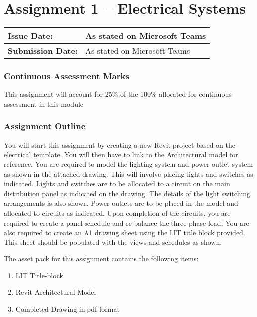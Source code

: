 


	
\part*{Assignment 1 – Electrical Systems}

\begin{tabularx}{\textwidth}{ |X|X| }
	\hline
	\textbf{Issue Date:} & As stated on Microsoft Teams \\
	\hline 
	\textbf{Submission Date:}  & As stated on Microsoft Teams  \\
	\hline
\end{tabularx}


\section*{Continuous Assessment Marks}
This assignment will account for 25\% of the 100\% allocated for continuous assessment in this module

\section*{Assignment Outline}
You will start this assignment by creating a new Revit project based on the electrical template. You will then have to link to the Architectural model for reference.
You are required to model the lighting system and power outlet system as shown in the attached drawing. This will involve placing lights and switches as indicated. Lights and switches are to be allocated to a circuit on the main distribution panel as indicated on the drawing. The details of the light switching arrangements is also shown.
Power outlets are to be placed in the model and allocated to circuits as indicated.
Upon completion of the circuits, you are required to create a panel schedule and re-balance the three-phase load.
You are also required to create an A1 drawing sheet using the LIT title block provided. This sheet should be populated with the views and schedules as shown.

The asset pack for this assignment contains the following items:
\begin{enumerate}
	\item LIT Title-block
	\item Revit Architectural Model
	\item Completed Drawing in pdf format
\end{enumerate}



